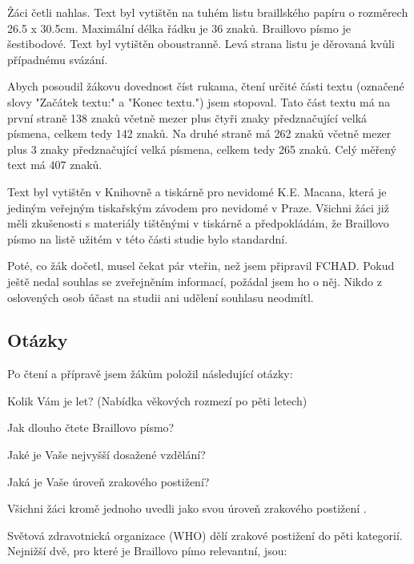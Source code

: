 Žáci četli nahlas. Text byl vytištěn na tuhém listu braillského papíru o rozměrech 26.5 x 30.5cm.  Maximální délka řádku je 36 znaků.  Braillovo písmo je šestibodové.  Text byl vytištěn oboustranně. Levá strana listu je děrovaná kvůli případnému svázání.

Abych posoudil žákovu dovednost číst rukama, čtení určité části textu (označené slovy "Začátek textu:" a "Konec textu.") jsem stopoval. Tato část textu má na první straně 138 znaků včetně mezer plus čtyři znaky předznačující velká písmena, celkem tedy 142 znaků. Na druhé straně má 262 znaků včetně mezer plus 3 znaky předznačující velká písmena, celkem tedy 265 znaků. Celý měřený text má 407 znaků.

Text byl vytištěn v Knihovně a tiskárně pro nevidomé K.E. Macana, která je jediným veřejným tiskařským závodem pro nevidomé v Praze.  Všichni žáci již měli zkušenosti s materiály tištěnými v tiskárně a předpokládám, že Braillovo písmo na listě užitém v této části studie bylo standardní.

Poté, co žák dočetl, musel čekat pár vteřin, než jsem připravil FCHAD. Pokud ještě nedal souhlas se zveřejněním informací, požádal jsem ho o něj.  Nikdo z oslovených osob účast na studii ani udělení souhlasu neodmítl.

\subsection{Otázky}

Po čtení a přípravě jsem žákům položil následující otázky:

Kolik Vám je let? (Nabídka věkových rozmezí po pěti letech)

Jak dlouho čtete Braillovo písmo?

Jaké je Vaše nejvyšší dosažené vzdělání?

Jaká je Vaše úroveň zrakového postižení?

Všichni žáci kromě jednoho uvedli jako svou úroveň zrakového postižení .

Světová zdravotnická organizace (WHO) dělí zrakové postižení do pěti kategorií. Nejnižší dvě, pro které je Braillovo pímo relevantní, jsou:

 \citep{sonsklasifikace}

